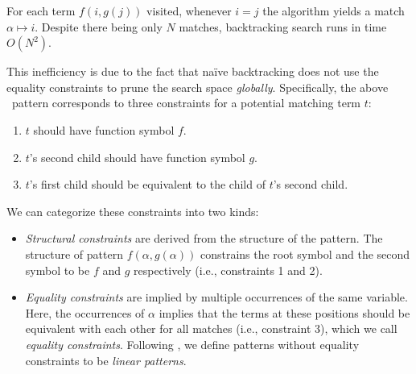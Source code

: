 For each term $f(i, g(j))$ visited, whenever $i=j$ the algorithm yields a match
$\alpha \mapsto i$. Despite there being only $N$ matches,
backtracking search runs in time $O(N^{2})$.

This inefficiency is due to the fact that na\"ive backtracking does not use the
equality constraints to prune the search space \textit{globally}. Specifically,
the above \ematching~pattern corresponds to three constraints for a potential
matching term $t$:
\begin{enumerate}
\item $t$ should have function symbol $f$.
\item $t$'s second child should have function symbol $g$.
\item $t$'s first child should be equivalent
      to the child of $t$'s second child.
\end{enumerate}

We can categorize these constraints into two kinds:
\begin{itemize}
  \item \textit{Structural constraints} are derived from the structure of the pattern.
    The structure of pattern
    $f(\alpha, g(\alpha))$ constrains the root symbol and the second symbol
    to be $f$ and $g$ respectively (i.e., constraints 1 and 2).
  \item \textit{Equality constraints}
    are implied by multiple occurrences of the same variable.
    Here, the occurrences of $\alpha$ implies that the terms at these positions
    should be equivalent with each other for all matches (i.e., constraint 3),
     which we call {\it equality constraints}.
    Following \citet{moskal}, we define patterns without equality constraints to be
    \textit{linear patterns}.
\end{itemize}

